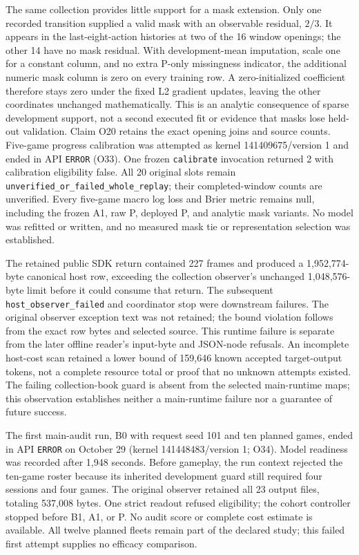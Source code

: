 \documentclass[11pt]{article}
\begin{document}
The same collection provides little support for a mask extension. Only one recorded transition supplied a valid mask with an observable residual, $2/3$. It appears in the last-eight-action histories at two of the 16 window openings; the other 14 have no mask residual. With development-mean imputation, scale one for a constant column, and no extra P-only missingness indicator, the additional numeric mask column is zero on every training row. A zero-initialized coefficient therefore stays zero under the fixed L2 gradient updates, leaving the other coordinates unchanged mathematically. This is an analytic consequence of sparse development support, not a second executed fit or evidence that masks lose held-out validation. Claim O20 retains the exact opening joins and source counts. Five-game progress calibration was attempted as kernel 141409675/version 1 and ended in API \texttt{ERROR} (O33). One frozen \texttt{calibrate} invocation returned 2 with calibration eligibility false. All 20 original slots remain \texttt{unverified\_or\_failed\_whole\_replay}; their completed-window counts are unverified. Every five-game macro log loss and Brier metric remains null, including the frozen A1, raw P, deployed P, and analytic mask variants. No model was refitted or written, and no measured mask tie or representation selection was established.

The retained public SDK return contained 227 frames and produced a 1,952,774-byte canonical host row, exceeding the collection observer's unchanged 1,048,576-byte limit before it could consume that return. The subsequent \texttt{host\_observer\_failed} and coordinator stop were downstream failures. The original observer exception text was not retained; the bound violation follows from the exact row bytes and selected source. This runtime failure is separate from the later offline reader's input-byte and JSON-node refusals. An incomplete host-cost scan retained a lower bound of 159,646 known accepted target-output tokens, not a complete resource total or proof that no unknown attempts existed. The failing collection-book guard is absent from the selected main-runtime maps; this observation establishes neither a main-runtime failure nor a guarantee of future success.

The first main-audit run, B0 with request seed 101 and ten planned games, ended in API \texttt{ERROR} on October 29 (kernel 141448483/version 1; O34). Model readiness was recorded after 1,948 seconds. Before gameplay, the run context rejected the ten-game roster because its inherited development guard still required four sessions and four games. The original observer retained all 23 output files, totaling 537,008 bytes. One strict readout refused eligibility; the cohort controller stopped before B1, A1, or P. No audit score or complete cost estimate is available. All twelve planned fleets remain part of the declared study; this failed first attempt supplies no efficacy comparison.
\end{document}
